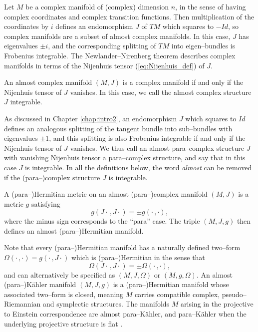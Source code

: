Let $M$ be a complex manifold of (complex) dimension $n$, in the sense of having complex coordinates and complex transition functions. Then multiplication of the coordinates by $i$ defines an endomorphism $J$ of $TM$ which squares to $-Id$, so complex manifolds are a subset of almost complex manifolds. In this case, $J$ has eigenvalues $\pm i$, and the corresponding splitting of $TM$ into eigen--bundles is Frobenius integrable. The Newlander--Nirenberg theorem describes complex manifolds in terms of the Nijenhuis tensor (\ref{eq:Nijenhuis_def}) of $J$.

\begin{theo}[\cite{CG}]
An almost complex manifold $(M,J)$ is a complex manifold if and only if the Nijenhuis tensor of $J$ vanishes. In this case, we call the almost complex structure $J$ integrable.
\end{theo}


As discussed in Chapter \ref{chap:intro2}, an endomorphism $J$ which squares to $Id$ defines an analogous splitting of the tangent bundle into sub--bundles with eigenvalues $\pm 1$, and this splitting is also Frobenius integrable if and only if the Nijenhuis tensor of $J$ vanishes. We thus call an almost para--complex structure $J$ with vanishing Nijenhuis tensor a para--complex structure, and say that in this case $J$ is integrable. In all the definitions below, the word \textit{almost} can be removed if the (para--)complex structure $J$ is integrable.

\begin{defi}
A (para--)Hermitian metric on an almost (para--)complex manifold $(M,J)$ is a metric $g$ satisfying
\[
g(J\cdot\,,J\cdot) = \pm g(\cdot\,,\cdot),
\]
where the minus sign corresponds to the ``para'' case. The triple $(M,J,g)$ then defines an almost (para--)Hermitian manifold.
\end{defi}

Note that every (para--)Hermitian manifold has a naturally defined two--form $\Omega(\cdot\,,\cdot)=g(\cdot\,,J\cdot)$ which is (para--)Hermitian in the sense that
\[
\Omega(J\cdot\,,J\cdot) = \pm \Omega(\cdot\,,\cdot),
\]
and can alternatively be specified as $(M,J,\Omega)$ or $(M,g,\Omega)$. An almost (para--)K\"ahler manifold $(M,J,g)$ is a (para--)Hermitian manifold whose associated two--form is closed, meaning $M$ carries compatible complex, pseudo--Riemannian and symplectic structures. The manifolds $M$ arising in the projective to Einstein correspondence are almost para--K\"ahler, and para--K\"ahler when the underlying projective structure is flat \cite{DM}.

